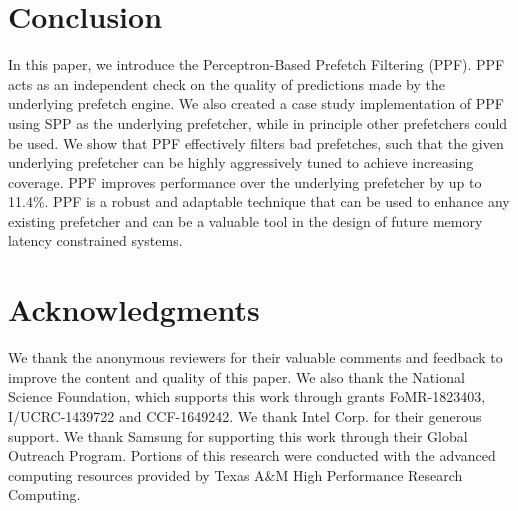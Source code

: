 \section{Conclusion}
\label{Conclusion}
In this paper, we introduce the Perceptron-Based Prefetch Filtering
(PPF).  PPF acts as an independent check on the quality of predictions
made by the underlying prefetch engine.  We also created a case study
implementation of PPF using SPP as the underlying prefetcher, while
in principle other prefetchers could be used.  We show that PPF
effectively filters bad prefetches, such that the given underlying
prefetcher can be highly aggressively tuned to achieve increasing
coverage.  PPF improves performance over the underlying 
prefetcher by up to 11.4\%.  PPF is a robust and adaptable technique 
that can be used to enhance any existing prefetcher and can be a 
valuable tool in the design of future memory latency constrained systems.

\section{Acknowledgments}

We thank the anonymous reviewers for their valuable comments and
feedback to improve the content and quality of this paper.  We also
thank the National Science Foundation, which supports this work
through grants FoMR-1823403, I/UCRC-1439722 and CCF-1649242.  We thank
Intel Corp. for their generous support. We thank Samsung for
supporting this work through their Global Outreach Program.  Portions
of this research were conducted with the advanced computing resources
provided by Texas A\&M High Performance Research Computing.
